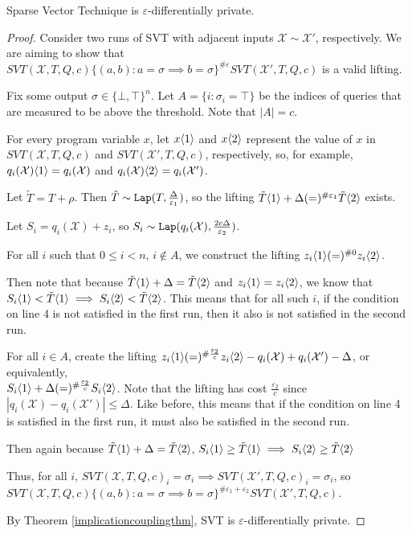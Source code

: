 \begin{thm}
    Sparse Vector Technique is $\varepsilon$-differentially private. 
\end{thm}

\begin{proof}
    Consider two runs of SVT with adjacent inputs $\mathcal{X}\sim\mathcal{X}'$, respectively. We are aiming to show that $SVT(\mathcal{X}, T, Q, c)\{(a, b): a=\sigma \implies b=\sigma\}^{\#\varepsilon}SVT(\mathcal{X}', T, Q, c)$ is a valid lifting. 

    Fix some output $\sigma \in \{\bot, \top\}^n$. Let $A = \{i:\sigma_i = \top\}$ be the indices of queries that are measured to be above the threshold. Note that $|A| = c$. 
    
    For every program variable $x$, let $x\langle1 \rangle$ and $x\langle2 \rangle$ represent the value of $x$ in $SVT(\mathcal{X}, T, Q, c)$ and $SVT(\mathcal{X}', T, Q, c)$, respectively, so, for example, $q_i(\mathcal{X})\langle1 \rangle = q_i(\mathcal{X})$ and $q_i(\mathcal{X})\langle2 \rangle = q_i(\mathcal{X}')$. 

    Let $\tilde{T}=T + \rho$. Then $\tilde{T} \sim \texttt{Lap}(T, \frac{\Delta}{\varepsilon_1})$, so the lifting $\tilde{T}\langle1 \rangle +\Delta (=)^{\#\varepsilon_1}\tilde{T}\langle2 \rangle$ exists. 

    Let $S_i = q_i(\mathcal{X}) + z_i$, so $S_i \sim\texttt{Lap}(q_i(\mathcal{X}), \frac{2c\Delta}{\varepsilon_2})$.

    For all $i$ such that $0\leq i < n$, $i\notin A$, we construct the lifting $z_i\langle1 \rangle (=)^{\#0}z_i\langle2 \rangle$. 

    Then note that because $\tilde{T}\langle1 \rangle+\Delta = \tilde{T}\langle2 \rangle$ and $z_i\langle1 \rangle = z_i \langle2 \rangle$, we know that $S_i\langle1 \rangle < \tilde{T}\langle1 \rangle \implies S_i\langle2 \rangle < \tilde{T}\langle2 \rangle$. This means that for all such $i$, if the condition on line 4 is not satisfied in the first run, then it also is not satisfied in the second run.

    For all $i\in A$, create the lifting $z_i\langle1 \rangle(=)^{\#\frac{\varepsilon_2}{c}}z_i\langle2 \rangle - q_i(\mathcal{X})+q_i(\mathcal{X}')-\Delta$, or equivalently, \\$S_i\langle1 \rangle +\Delta (=)^{\#\frac{\varepsilon_2}{c}} S_i\langle2 \rangle$. Note that the lifting has cost $\frac{\varepsilon_2}{c}$ since $|q_i(\mathcal{X})-q_i(\mathcal{X}')|\leq \Delta$. Like before, this means that if the condition on line 4 is satisfied in the first run, it must also be satisfied in the second run. 

    Then again because $\tilde{T}\langle1 \rangle +\Delta = \tilde{T}\langle2 \rangle$, $S_i\langle1 \rangle \geq \tilde{T}\langle1 \rangle \implies S_i\langle2 \rangle \geq \tilde{T}\langle2 \rangle$

    Thus, for all $i$, $SVT(\mathcal{X}, T, Q, c)_i = \sigma_i \implies SVT(\mathcal{X}', T, Q, c)_i = \sigma_i$, so $SVT(\mathcal{X}, T, Q, c)\{(a, b): a=\sigma \implies b=\sigma\}^{\#\varepsilon_1+\varepsilon_2}SVT(\mathcal{X}', T, Q, c)$.

    By Theorem \ref{implicationcouplingthm}, SVT is $\varepsilon$-differentially private. 
\end{proof}
